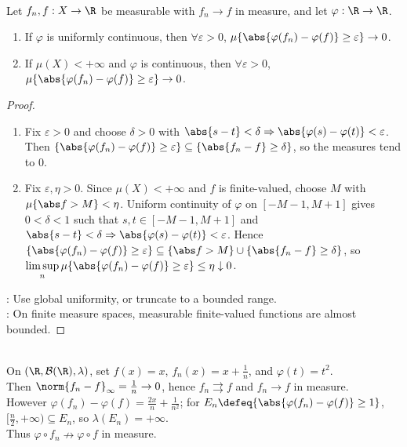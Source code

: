 \begin{proposition} \label{prop:composition-preserves-convergence-in-measure} \\
Let $f_n,f:X\to\R$ be measurable with $f_n\to f$ in measure, and let $\varphi:\R\to\R$.
\begin{enumerate}[label=(\roman*)]
\setlength{\itemsep}{0pt}
\item If $\varphi$ is uniformly continuous, then $\forall\varepsilon>0$, $\mu\{\abs{\varphi(f_n)-\varphi(f)}\geq\varepsilon\}\to0$.
\item If $\mu(X)<+\infty$ and $\varphi$ is continuous, then $\forall\varepsilon>0$, $\mu\{\abs{\varphi(f_n)-\varphi(f)}\geq\varepsilon\}\to0$.
\end{enumerate}
\begin{proof}
\begin{enumerate}[label=(\roman*)]
\setlength{\itemsep}{0pt}
\item Fix $\varepsilon>0$ and choose $\delta>0$ with $\abs{s-t}<\delta\Rightarrow\abs{\varphi(s)-\varphi(t)}<\varepsilon$.\\
Then $\{\abs{\varphi(f_n)-\varphi(f)}\geq\varepsilon\}\subseteq\{\abs{f_n-f}\geq\delta\}$, so the measures tend to $0$.
\item Fix $\varepsilon,\eta>0$. Since $\mu(X)<+\infty$ and $f$ is finite-valued, choose $M$ with $\mu\{\abs f>M\}<\eta$. Uniform continuity of $\varphi$ on $[-M-1,M+1]$ gives $0<\delta<1$ such that $s,t\in[-M-1,M+1]$ and $\abs{s-t}<\delta\Rightarrow\abs{\varphi(s)-\varphi(t)}<\varepsilon$. Hence $\{\abs{\varphi(f_n)-\varphi(f)}\geq\varepsilon\}\subseteq\{\abs f>M\}\cup\{\abs{f_n-f}\geq\delta\}$, so $\limsup\limits_n\mu\{\abs{\varphi(f_n)-\varphi(f)}\geq\varepsilon\}\leq\eta\downarrow0$.
\end{enumerate}
: Use global uniformity, or truncate to a bounded range.\\
: On finite measure spaces, measurable finite-valued functions are almost bounded.
\end{proof}
\end{proposition}

\begin{example} \label{ex:continuous-composition-in-measure-needs-hypotheses} \\
On $(\R,\mathcal{B}(\R),\lambda)$, set $f(x)=x$, $f_n(x)=x+\frac{1}{n}$, and $\varphi(t)=t^2$.\\
Then $\norm{f_n-f}_\infty=\frac{1}{n}\to0$, hence $f_n\rightrightarrows f$ and $f_n\to f$ in measure.\\
However $\varphi(f_n)-\varphi(f)=\frac{2x}{n}+\frac{1}{n^2}$; for $E_n\defeq\{\abs{\varphi(f_n)-\varphi(f)}\geq1\}$, $[\frac{n}{2},+\infty)\subseteq E_n$, so $\lambda(E_n)=+\infty$.\\
Thus $\varphi\circ f_n\nrightarrow\varphi\circ f$ in measure.
\end{example}

